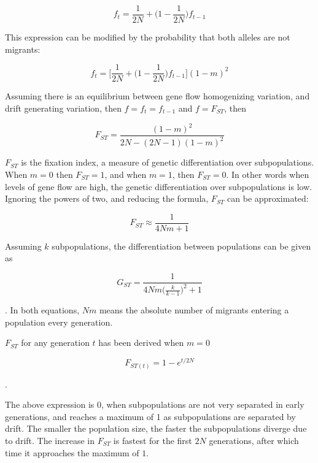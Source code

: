 \begin{equation}
f_t=\frac{1}{2N}+\bigg(1 - \frac{1}{2N}\bigg)f_{t-1}
\end{equation}

This expression can be modified by the probability that both alleles are not migrants:

\begin{equation} \label{eq:ft}
f_t=\bigg[\frac{1}{2N}+\bigg(1 - \frac{1}{2N}\bigg)f_{t-1}\bigg](1-m)^2
\end{equation}

Assuming there is an equilibrium between gene flow homogenizing variation, and drift generating variation, then $f = f_t = f_{t-1}$ and $f = F_{ST}$, then

\begin{equation}
F_{ST} = \frac{(1-m)^2}{2N-(2N-1)(1-m)^2}
\end{equation}

\parencite{Hedrick2010}

$F_{ST}$ is the fixation index, a measure of genetic differentiation over subpopulations.
When $m = 0$ then $F_{ST} = 1$, and when $m=1$, then $F_{ST}=0$.
In other words when levels of gene flow are high, the genetic differentiation over subpopulations is low.
Ignoring the powers of two, and reducing the formula, $F_{ST}$ can be approximated:

\begin{equation} \label{eq:fstapprox}
F_{ST} \approx \frac{1}{4Nm + 1}
\end{equation}

Assuming $k$ subpopulations, the differentiation between populations can be given as

\begin{equation}
G_{ST} = \frac{1}{4Nm\bigg(\frac{k}{k-1}\bigg)^2 + 1}
\end{equation}

\parencite{Slatkin1995}.
In both equations, $Nm$ means the absolute number of migrants entering a population every generation.

$F_{ST}$ for any generation $t$ has been derived when $m = 0$

\begin{equation}
F_{ST(t)} = 1 - e^{t/2N}
\end{equation}

\parencite{Wright1943}.

The above expression is 0, when subpopulations are not very separated in early generations, and reaches a maximum of 1 as subpopulations are separated by drift.
The smaller the population size, the faster the subpopulations diverge due to drift.
The increase in $F_{ST}$ is fastest for the first $2N$ generations, after which time it approaches the maximum of $1$.

